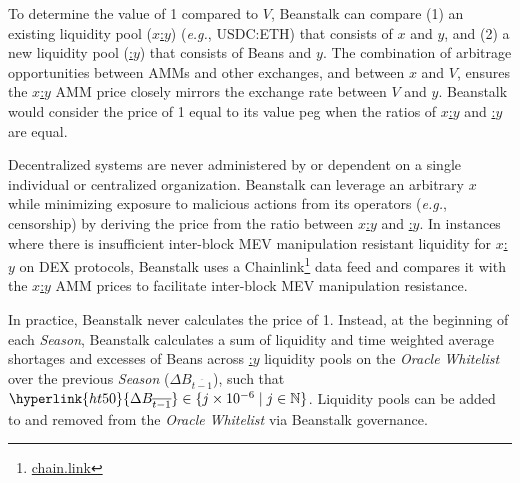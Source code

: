 \documentclass[tikz]{article}
\newcommand{\term}[1]{\textsl{#1}}
\newcommand{\fref}[1]{\footnote{\href{http://#1}{#1}}}
\newcommand{\Bean}{} %
\begin{document}
To determine the value of \Bean1 compared to \hyperlink{ht216}{$V$}, Beanstalk can compare (1) an existing liquidity pool (\hyperlink{ht224}{$x$:$y$}) (\term{e.g.}, USDC:ETH) that consists of \hyperlink{ht223}{$x$} and \hyperlink{ht227}{$y$}, and (2) a new liquidity pool (\hyperlink{ht6}{\Bean:$y$}) that consists of Beans and \hyperlink{ht227}{$y$}. The combination of arbitrage opportunities between AMMs and other exchanges, and between \hyperlink{ht223}{$x$} and \hyperlink{ht216}{$V$}, ensures the \hyperlink{ht224}{$x$:$y$} AMM price closely mirrors the exchange rate between \hyperlink{ht216}{$V$} and \hyperlink{ht227}{$y$}. Beanstalk would consider the price of \Bean1 equal to its value peg when the ratios of \hyperlink{ht224}{$x$:$y$} and \hyperlink{ht6}{\Bean:$y$} are equal. 

Decentralized systems are never administered by or dependent on a single individual or centralized organization. Beanstalk can leverage an arbitrary \hyperlink{ht223}{$x$} while minimizing exposure to malicious actions from its operators (\term{e.g.}, censorship) by deriving the price from the ratio between \hyperlink{ht224}{$x$:$y$} and \hyperlink{ht6}{\Bean:$y$}. In instances where there is insufficient inter-block MEV manipulation resistant liquidity for \hyperlink{ht224}{$x$:$y$} on DEX protocols, Beanstalk uses a Chainlink\fref{chain.link} data feed and compares it with the \hyperlink{ht224}{$x$:$y$} AMM prices to facilitate inter-block MEV manipulation resistance.

In practice, Beanstalk never calculates the price of \Bean1. Instead, at the beginning of each \term{Season}, Beanstalk calculates a sum of liquidity and time weighted average shortages and excesses of Beans across \hyperlink{ht6}{\Bean:$y$} liquidity pools on the \term{Oracle} \term{Whitelist} over the previous \term{Season} (\hyperlink{ht50}{$\Delta B_{\overline{t-1}}$}), such that $\hyperlink{ht50}{\Delta B_{\overline{t-1}}} \in \{j \times 10^{-6} \mid j \in \mathbb{N} \}$. Liquidity pools can be added to and removed from the \term{Oracle} \term{Whitelist} via Beanstalk governance.
\end{document}
